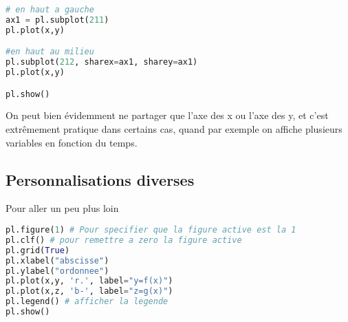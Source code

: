 \documentclass[a4paper,twoside]{article}
\begin{document}
\begin{lstlisting}[language=python]
# en haut a gauche
ax1 = pl.subplot(211)
pl.plot(x,y)

#en haut au milieu
pl.subplot(212, sharex=ax1, sharey=ax1)
pl.plot(x,y)

pl.show()
\end{lstlisting}

\begin{remarque}
On peut bien évidemment ne partager que l'axe des x ou l'axe des y, et c'est extrêmement pratique dans certains cas, quand par exemple on affiche plusieurs variables en fonction du temps.
\end{remarque}

\subsection{Personnalisations diverses}

Pour aller un peu plus loin
\begin{lstlisting}[language=python]
pl.figure(1) # Pour specifier que la figure active est la 1
pl.clf() # pour remettre a zero la figure active
pl.grid(True)
pl.xlabel("abscisse")
pl.ylabel("ordonnee")
pl.plot(x,y, 'r.', label="y=f(x)")
pl.plot(x,z, 'b-', label="z=g(x)")
pl.legend() # afficher la legende
pl.show()
\end{lstlisting}
\end{document}

